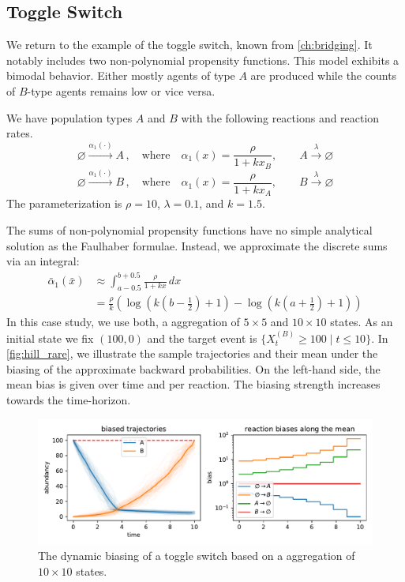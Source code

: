 \subsection{Toggle Switch}
We return to the example of the toggle switch, known from \autoref{ch:bridging}.
It notably includes two non-polynomial propensity functions.
This model exhibits a bimodal behavior.
Either mostly agents of type $A$ are produced while the counts of $B$-type agents remains low or vice versa.
\begin{model}\label{model:hill_toggle_rare}
We have population types $A$ and $B$ with the following reactions and reaction rates.
$$ \varnothing \xrightarrow{\alpha_1(\cdot)} A\,,\quad \text{where}\quad \alpha_1(x) = \frac{\rho}{1 + k x_B},
\qquad A \xrightarrow\lambda \varnothing $$
$$ \varnothing \xrightarrow{\alpha_1(\cdot)} B\,,\quad \text{where}\quad \alpha_1(x) = \frac{\rho}{1 + k x_A},
\qquad B \xrightarrow\lambda \varnothing $$
The parameterization is $\rho=10$, $\lambda=0.1$, and $k=1.5$.
\end{model}
The sums of non-polynomial propensity functions have no simple analytical solution as the Faulhaber formulae.
Instead, we approximate the discrete sums via an integral:
\[
\begin{split}
    \bar{\alpha}_1(\bar{x})&\approx\int_{a-0.5}^{b+0.5} \frac{\rho}{1 + kx}\, dx\\
    &= \frac{\rho}{k} \left(\log{\left(k\left(b - \frac{1}{2}\right) + 1\right)} - \log{\left(k\left(a + \frac{1}{2}\right) + 1 \right)} \right)
\end{split}
\]
In this case study, we use both, a aggregation of $5\times 5$ and $10\times10$ states.
As an initial state we fix $(100, 0)$ and the target event is
\(\{X_t^{(B)} \geq 100 \mid t\leq 10 \}\).
In \autoref{fig:hill_rare}, we illustrate the sample trajectories and their mean under the biasing of the approximate backward probabilities.
On the left-hand side, the mean bias is given over time and per reaction.
The biasing strength increases towards the time-horizon.
\begin{figure}[htb]
    \centering
    \includegraphics[width=\textwidth]{gfx/hill_toggle_is.pdf}
    \caption[Dynamic biasing for the toggle switch]{\label{fig:hill_rare}The dynamic biasing of a toggle switch based on a aggregation of $10\times 10$ states.}
\end{figure}

